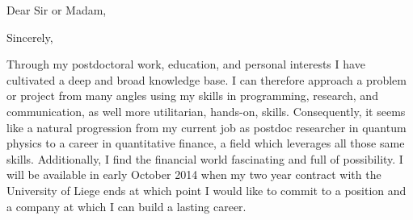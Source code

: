 \documentclass[12pt,a4paper,ariel]{moderncv}        %
\begin{document}
%
%
%
%
\recipient{\quad}{}
\date{\today}
\opening{Dear Sir or Madam,}
\closing{Sincerely,}
\makelettertitle
Through my postdoctoral work, education, and personal interests I have cultivated a deep and broad knowledge base. I can therefore approach a problem or project from many angles using my skills in programming, research, and communication, as well more utilitarian, hands-on, skills.  Consequently, it seems like a natural progression from my current job as postdoc researcher in quantum physics to a career in quantitative finance, a field which leverages all those same skills.  Additionally, I find the financial world fascinating and full of possibility.  I will be available in early October 2014 when my two year contract with the University of Liege ends at which point I would like to commit to a position and a company at which I can build a lasting career.
 
\end{document}
